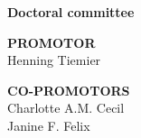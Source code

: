 
\clearpage
\thispagestyle{empty} 
\centering
\textbf{Doctoral committee}

\vspace{1em}
\textbf{PROMOTOR}\\
Henning Tiemier

\vspace{1em}
\textbf{CO-PROMOTORS}\\
Charlotte A.M. Cecil\\
Janine F. Felix
\clearpage